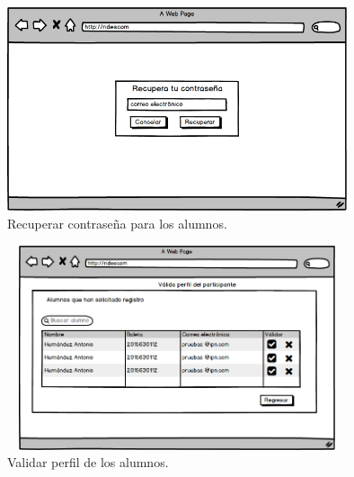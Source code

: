 	\begin{figure}[hbt!]
		\centering
		\includegraphics[width=10cm, height=6cm]{Imagenes/Disenos/VistasBorradas/p5Recuperarcontrasena.png}
		\caption{Recuperar contraseña para los alumnos.}
	\end{figure}

	\begin{figure}[hbt!]
		\centering
		\includegraphics[width=10cm, height=6cm]{Imagenes/Disenos/VistasBorradas/p18ValidaPerfil.png}
		\caption{Validar perfil de los alumnos.}
	\end{figure}
	\pagebreak

	